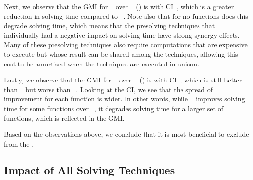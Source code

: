 Next, we observe that the \gls{GMI} for ~ over ~
() is \printGMI{%
  \SolvTechDisableBadPresolvingPrePlusSolvingTimeSpeedupPrePlusSolvingTimeRegularSpeedupGmean%
} with \gls{CI}~\printGMICI{%
  \SolvTechDisableBadPresolvingPrePlusSolvingTimeSpeedupPrePlusSolvingTimeRegularSpeedupCiMin%
}{%
  \SolvTechDisableBadPresolvingPrePlusSolvingTimeSpeedupPrePlusSolvingTimeRegularSpeedupCiMax%
}, which is a greater reduction in solving time compared to ~.
%
Note also that for no \glspl{function} does this 
degrade solving time, which means that the \gls{presolving} techniques that
individually had a negative impact on solving time have strong synergy effects.
%
Many of these \gls{presolving} techniques also require computations that are
expensive to execute but whose result can be shared among the techniques,
allowing this cost to be amortized when the techniques are executed in unison.

Lastly, we observe that the \gls{GMI} for ~ over ~
() is \printGMI{%
  \SolvTechDisableAllPresolvingPrePlusSolvingTimeSpeedupPrePlusSolvingTimeRegularSpeedupGmean%
} with \gls{CI}~\printGMICI{%
  \SolvTechDisableAllPresolvingPrePlusSolvingTimeSpeedupPrePlusSolvingTimeRegularSpeedupCiMin%
}{%
  \SolvTechDisableAllPresolvingPrePlusSolvingTimeSpeedupPrePlusSolvingTimeRegularSpeedupCiMax%
}, which is still better than ~ but worse than ~.
%
Looking at the \gls{CI}, we see that the spread of improvement for each
\gls{function} is wider.
%
In other words, while ~
improves solving time for some \glspl{function} over ~, it degrades solving time for a larger
set of \glspl{function}, which is reflected in the \gls{GMI}.

Based on the observations above, we conclude that it is most beneficial to
exclude 
from the .


\subsection{Impact of All Solving Techniques}

